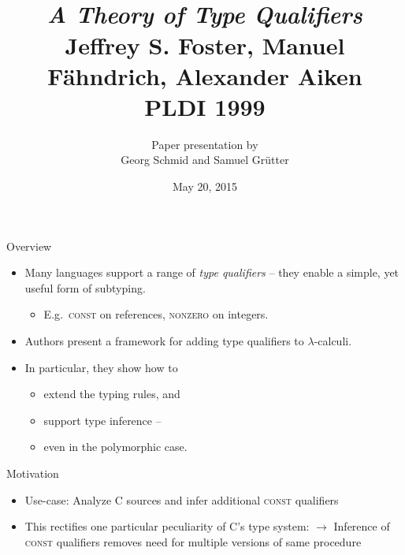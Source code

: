 \documentclass{beamer}
\title{\\\emph{A Theory of Type Qualifiers}\\ 
\small{}Jeffrey S. Foster, Manuel Fähndrich, Alexander Aiken\\
PLDI 1999}
\author{Paper presentation by\\Georg Schmid and Samuel Grütter}
\date{May 20, 2015}
\begin{document}
\maketitle

\begin{frame}{Overview}
  \begin{itemize}
  \item Many languages support a range of \emph{type qualifiers} -- 
    they enable a simple, yet useful form of subtyping.\\
    \begin{itemize}\item E.g.\ \textsc{const} on references, \textsc{nonzero} on integers.\end{itemize}

  \item Authors present a framework for adding type qualifiers to $\lambda$-calculi.

  \item In particular, they show how to
    \begin{itemize}
    \item extend the typing rules, and
    \item support type inference --
    \item even in the polymorphic case.
    \end{itemize}
  \end{itemize}
\end{frame}



\begin{frame}[fragile]{Motivation}
  \begin{itemize}

  \item<1-> Use-case: Analyze C sources and infer additional \textsc{const} qualifiers

  \item<2->
    This rectifies one particular peculiarity of C's type system:
    \lstcduplicateprocs
    $\rightarrow$ Inference of \textsc{const} qualifiers removes need for multiple versions of same procedure
  \end{itemize}
\end{frame}
\end{document}

